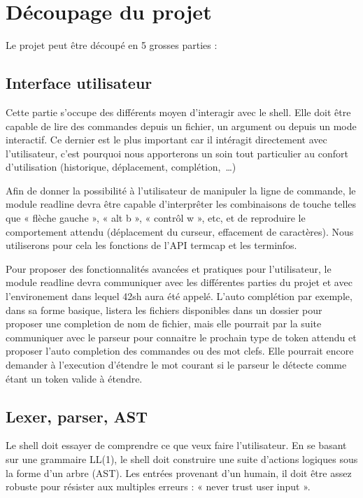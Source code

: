\section{Découpage du projet}

Le projet peut être découpé en 5 grosses parties :
\subsection{Interface utilisateur}

Cette partie s'occupe des différents moyen d'interagir avec le shell. Elle doit
être capable de lire des commandes depuis un fichier, un argument ou depuis un
mode interactif. Ce dernier est le plus important car il intéragit directement
avec l'utilisateur, c'est pourquoi nous apporterons un soin tout particulier au
confort d'utilisation (historique, déplacement, complétion,~\dots)

Afin de donner la possibilité à l'utilisateur de manipuler la ligne de commande,
le module readline devra être capable d'interprêter les combinaisons de touche
telles que « flèche gauche », « alt b », « contrôl w », etc, et de reproduire le
comportement attendu (déplacement du curseur, effacement de caractères). Nous
utiliserons pour cela les fonctions de l'API termcap et les terminfos.

Pour proposer des fonctionnalités avancées et pratiques pour l'utilisateur, le
module readline devra communiquer avec les différentes parties du projet et avec
l'environement dans lequel 42sh aura été appelé. L'auto complétion par exemple,
dans sa forme basique, listera les fichiers disponibles dans un dossier pour
proposer une completion de nom de fichier, mais elle pourrait par la suite
communiquer avec le parseur pour connaitre le prochain type de token attendu
et proposer l'auto completion des commandes ou des mot clefs. Elle pourrait
encore demander à l'execution d'étendre le mot courant si le parseur le détecte
comme étant un token valide à étendre.

\subsection{Lexer, parser, AST}

Le shell doit essayer de comprendre ce que veux faire l'utilisateur. En se
basant sur une grammaire LL(1), le shell doit construire une suite d'actions
logiques sous la forme d'un arbre (AST). Les entrées provenant d'un humain, il
doit être assez robuste pour résister aux multiples erreurs : « never trust
user input ».

